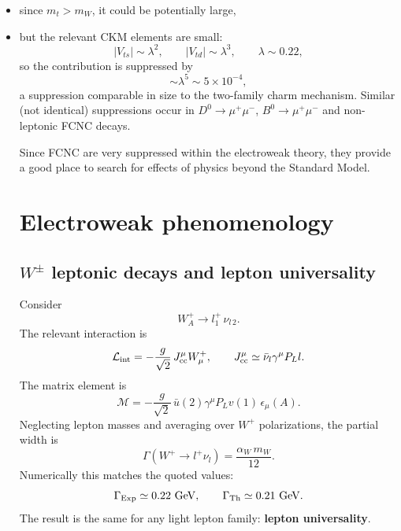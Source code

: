 \begin{itemize}
  \item since $m_t>m_W$, it could be potentially large,
  \item but the relevant CKM elements are small:
\[
|V_{ts}|\sim \lambda^2,\qquad |V_{td}|\sim \lambda^3,\qquad \lambda\sim 0.22,
\]
so the contribution is suppressed by
\begin{equation}
\boxed{
\sim \lambda^5 \sim 5\times 10^{-4},
}
\end{equation}
a suppression comparable in size to the two-family charm mechanism.
Similar (not identical) suppressions occur in $D^0\to \mu^+\mu^-$, $B^0\to \mu^+\mu^-$ and non-leptonic FCNC decays.

Since FCNC are very suppressed within the electroweak theory, they provide a good place to search for effects of physics beyond the Standard Model.

\section{Electroweak phenomenology}
\subsection{$W^\pm$ leptonic decays and lepton universality}
Consider
\[
W_A^+\to l_1^+\,\nu_{l\,2}.
\]
The relevant interaction is
\begin{equation}
\mathcal L_{\rm int}= -\frac{g}{\sqrt{2}}\,J^\mu_{\rm cc}W^+_\mu,
\qquad
J^\mu_{\rm cc}\simeq \bar\nu_l\gamma^\mu P_L l.
\end{equation}
The matrix element is
\begin{equation}
\mathcal M
= -\frac{g}{\sqrt{2}}\,
\bar u(2)\gamma^\mu P_L v(1)\,\epsilon_\mu(A).
\end{equation}
Neglecting lepton masses and averaging over $W^+$ polarizations, the partial width is
\begin{equation}
\boxed{
\Gamma(W^+\to l^+\nu_l)
=
\frac{\alpha_W\,m_W}{12}.
}
\label{eq:Wleptonic}
\end{equation}
Numerically this matches the quoted values:
\[
\Gamma_{\rm Exp}\simeq 0.22~\mathrm{GeV},
\qquad
\Gamma_{\rm Th}\simeq 0.21~\mathrm{GeV}.
\]
The result is the same for any light lepton family: \textbf{lepton universality}.


\end{itemize}
